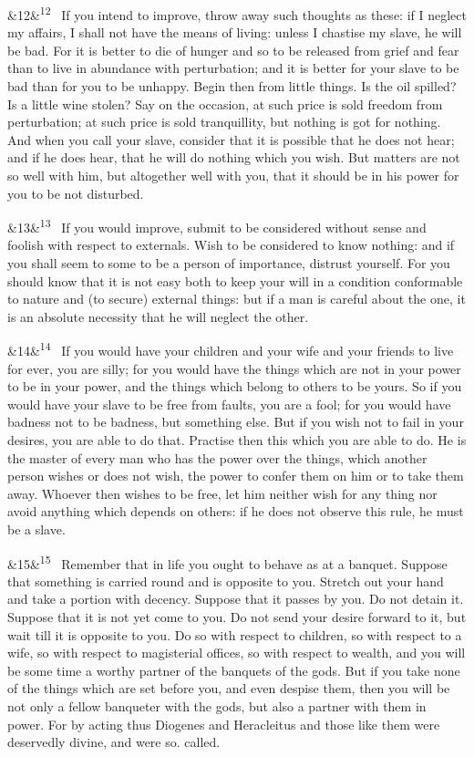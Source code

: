 \documentclass[12pt]{article}
\newcommand{\para}[1][]{\par\noindent\ifx&#1&\else\textsuperscript{\footnotesize #1}~\fi}
\begin{document}
\para[12] If you intend to improve, throw away such thoughts as these: if I neglect my affairs, I shall not have the means of living: unless I chastise my slave, he will be bad. For it is better to die of hunger and so to be released from grief and fear than to live in abundance with perturbation; and it is better for your slave to be bad than for you to be unhappy. Begin then from little things. Is the oil spilled? Is a little wine stolen? Say on the occasion, at such price is sold freedom from perturbation; at such price is sold tranquillity, but nothing is got for nothing. And when you call your slave, consider that it is possible that he does not hear; and if he does hear, that he will do nothing which you wish. But matters are not so well with him, but altogether well with you, that it should be in his power for you to be not disturbed.

\para[13] If you would improve, submit to be considered without sense and foolish with respect to externals. Wish to be considered to know nothing: and if you shall seem to some to be a person of importance, distrust yourself. For you should know that it is not easy both to keep your will in a condition conformable to nature and (to secure) external things: but if a man is careful about the one, it is an absolute necessity that he will neglect the other.

\para[14] If you would have your children and your wife and your friends to live for ever, you are silly; for you would have the things which are not in your power to be in your power, and the things which belong to others to be yours. So if you would have your slave to be free from faults, you are a fool; for you would have badness not to be badness, but something else. But if you wish not to fail in your desires, you are able to do that. Practise then this which you are able to do. He is the master of every man who has the power over the things, which another person wishes or does not wish, the power to confer them on him or to take them away. Whoever then wishes to be free, let him neither wish for any thing nor avoid anything which depends on others: if he does not observe this rule, he must be a slave.

\para[15] Remember that in life you ought to behave as at a banquet. Suppose that something is carried round and is opposite to you. Stretch out your hand and take a portion with decency. Suppose that it passes by you. Do not detain it. Suppose that it is not yet come to you. Do not send your desire forward to it, but wait till it is opposite to you. Do so with respect to children, so with respect to a wife, so with respect to magisterial offices, so with respect to wealth, and you will be some time a worthy partner of the banquets of the gods. But if you take none of the things which are set before you, and even despise them, then you will be not only a fellow banqueter with the gods, but also a partner with them in power. For by acting thus Diogenes and Heracleitus and those like them were deservedly divine, and were so. called.
\end{document}
